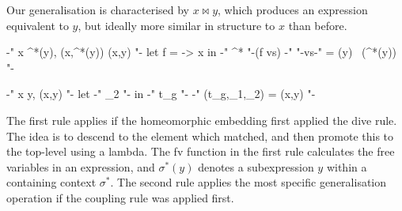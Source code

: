 \documentclass{llncs}
\begin{document}
Our generalisation is characterised by $x \bowtie y$, which produces an expression equivalent to $y$, but ideally more similar in structure to $x$ than before.

\begin{code}
{-" x \bowtie \sigma^*(y), (x,\sigma^*(y)) \wedge {}(x,y) "-}
        let f = \vs -> x in {-" \sigma^* "-}(f vs)
        {-"  "-}vs{-" = (y) \ (\sigma^*(y)) "-}
\end{code}

\vspace{-2mm}

\begin{code}
{-" x \bowtie y, (x,y) "-}
        let {-" \theta_2 "-} in {-" t_g "-}
        {-" (t_g,\theta_1,\theta_2) = (x,y) "-}
\end{code}

The first rule applies if the homeomorphic embedding first applied the dive rule. The idea is to descend to the element which matched, and then promote this to the top-level using a lambda. The fv function in the first rule calculates the free variables in an expression, and $\sigma^*(y)$ denotes a subexpression $y$ within a containing context $\sigma^*$. The second rule applies the most specific generalisation operation if the coupling rule was applied first.
\end{document}
